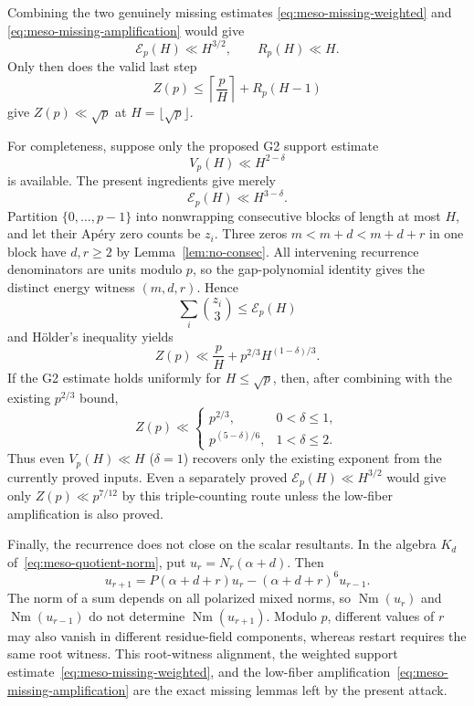 Combining the two genuinely missing estimates
\eqref{eq:meso-missing-weighted} and
\eqref{eq:meso-missing-amplification} would give
\[
 \mathcal E_p(H)\ll H^{3/2},\qquad R_p(H)\ll H.
\]
Only then does the valid last step
\[
 Z(p)\leq\left\lceil\frac pH\right\rceil+R_p(H-1)
\]
give $Z(p)\ll\sqrt p$ at $H=\lfloor\sqrt p\rfloor$.

For completeness, suppose only the proposed G2 support estimate
\[
 V_p(H)\ll H^{2-\delta}
\]
is available.  The present ingredients give merely
\[
 \mathcal E_p(H)\ll H^{3-\delta}.
\]
Partition $\{0,\ldots,p-1\}$ into nonwrapping consecutive blocks of
length at most $H$, and let their Ap\'ery zero counts be $z_i$.  Three
zeros $m<m+d<m+d+r$ in one block have $d,r\geq2$ by
Lemma~\ref{lem:no-consec}.  All intervening recurrence denominators are
units modulo $p$, so the gap-polynomial identity gives the distinct energy
witness $(m,d,r)$.  Hence
\[
 \sum_i\binom{z_i}{3}\leq\mathcal E_p(H)
\]
and H\"older's inequality yields
\begin{equation}\label{eq:meso-triple-endpoint}
 Z(p)\ll\frac pH+p^{2/3}H^{(1-\delta)/3}.
\end{equation}
If the G2 estimate holds uniformly for $H\leq\sqrt p$, then, after
combining with the existing $p^{2/3}$ bound,
\[
 Z(p)\ll
 \begin{cases}
 p^{2/3},&0<\delta\leq1,\\
 p^{(5-\delta)/6},&1<\delta\leq2.
 \end{cases}
\]
Thus even $V_p(H)\ll H$ ($\delta=1$) recovers only the existing exponent
from the currently proved inputs.  Even a separately proved
$\mathcal E_p(H)\ll H^{3/2}$ would give only $Z(p)\ll p^{7/12}$ by this
triple-counting route unless the low-fiber amplification is also proved.

Finally, the recurrence does not close on the scalar resultants.  In the
algebra $K_d$ of~\eqref{eq:meso-quotient-norm}, put
$u_r=N_r(\alpha+d)$.  Then
\[
 u_{r+1}=P(\alpha+d+r)u_r-(\alpha+d+r)^6u_{r-1}.
\]
The norm of a sum depends on all polarized mixed norms, so
$\operatorname {Nm}(u_r)$ and $\operatorname {Nm}(u_{r-1})$ do not
determine $\operatorname {Nm}(u_{r+1})$.  Modulo $p$, different values of
$r$ may also vanish in different residue-field components, whereas restart
requires the same root witness.  This root-witness alignment, the weighted
support estimate~\eqref{eq:meso-missing-weighted}, and the low-fiber
amplification~\eqref{eq:meso-missing-amplification} are the exact missing
lemmas left by the present attack.
